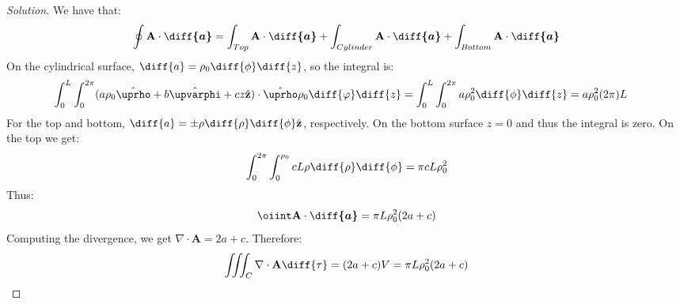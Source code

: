 \documentclass[crop=false,class=book,oneside]{standalone}
\begin{document}
            \begin{proof}[Solution]
                We have that:
                \begin{equation*}
                    \oint\mathbf{A}\cdot\boldsymbol{\diff{a}}
                    =\int_{Top}\mathbf{A}\cdot\boldsymbol{\diff{a}}
                    +\int_{Cylinder}\mathbf{A}\cdot\boldsymbol{\diff{a}}
                    +\int_{Bottom}\mathbf{A}\cdot\boldsymbol{\diff{a}}
                \end{equation*}
                On the cylindrical surface, 
                $\diff{a}=\rho_{0}\diff{\phi}\diff{z}$,
                so the integral is:
                \begin{align*}
                    \int_{0}^{L}\int_{0}^{2\pi}
                    (a\rho_0\hat{\boldsymbol{\uprho}}
                     +b\hat{\boldsymbol{\upvarphi}}
                     +cz\hat{\mathbf{z}})
                    \cdot\hat{\boldsymbol{\uprho}}\rho_{0}
                    \diff{\varphi}\diff{z}
                    &=\int_{0}^{L}\int_{0}^{2\pi}a\rho_{0}^{2}
                    \diff{\phi}\diff{z}
                    =a\rho_0^{2}(2\pi)L    
                \end{align*}
                For the top and bottom,
                $\diff{a}%
                 =\pm\rho\diff{\rho}\diff{\phi}\hat{\mathbf{z}}$,
                respectively. On the bottom surface $z=0$ and thus
                the integral is zero. On the top we get:
                \begin{equation*}
                    \int_{0}^{2\pi}\int_{0}^{\rho_0}
                    cL\rho\diff{\rho}\diff{\phi}
                    =\pi cL\rho_0^{2}
                \end{equation*}
                Thus:
                \begin{equation*}
                    \oiint\mathbf{A}\cdot\boldsymbol{\diff{a}}
                    =\pi{L}\rho_0^{2}(2a+c)
                \end{equation*}
                Computing the divergence, we get
                $\nabla\cdot\mathbf{A}=2a+c$. Therefore:
                \begin{equation*}
                    \iiint_C\nabla\cdot\mathbf{A}\diff{\tau}
                    =(2a+c)V=\pi{L}\rho_{0}^{2}(2a+c)
                \end{equation*}
            \end{proof}
\end{document}
